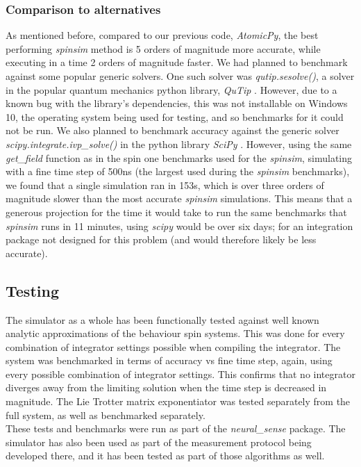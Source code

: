 \documentclass{jors}
\begin{document}
		\subsubsection*{Comparison to alternatives}
			As mentioned before, compared to our previous code, \emph{AtomicPy}, the best performing \emph{spinsim} method is 5 orders of magnitude more accurate, while executing in a time 2 orders of magnitude faster. We had planned to benchmark against some popular generic solvers. One such solver was \emph{qutip.sesolve()}, a solver in the popular quantum mechanics python library, \emph{QuTip} \cite{johansson_qutip_2013}. However, due to a known bug with the library’s dependencies, this was not installable on Windows 10, the operating system being used for testing, and so benchmarks for it could not be run. We also planned to benchmark accuracy against the generic solver \emph{scipy.integrate.ivp\_solve()} in the python library \emph{SciPy} \cite{virtanen_scipy_2020}. However, using the same \emph{get\_field} function as in the spin one benchmarks used for the \emph{spinsim}, simulating with a fine time step of 500ns (the largest used during the \emph{spinsim} benchmarks), we found that a single simulation ran in 153s, which is over three orders of magnitude slower than the most accurate \emph{spinsim} simulations. This means that a generous projection for the time it would take to run the same benchmarks that \emph{spinsim} runs in 11 minutes, using \emph{scipy} would be over six days; for an integration package not designed for this problem (and would therefore likely be less accurate).

	\subsection*{Testing}
		The simulator as a whole has been functionally tested against well known analytic approximations of the behaviour spin systems. This was done for every combination of integrator settings possible when compiling the integrator. The system was benchmarked in terms of accuracy vs fine time step, again, using every possible combination of integrator settings. This confirms that no integrator diverges away from the limiting solution when the time step is decreased in magnitude. The Lie Trotter matrix exponentiator was tested separately from the full system, as well as benchmarked separately.\\

		These tests and benchmarks were run as part of the \emph{neural\_sense} package. The simulator has also been used as part of the measurement protocol being developed there, and it has been tested as part of those algorithms as well.\\
\end{document}
